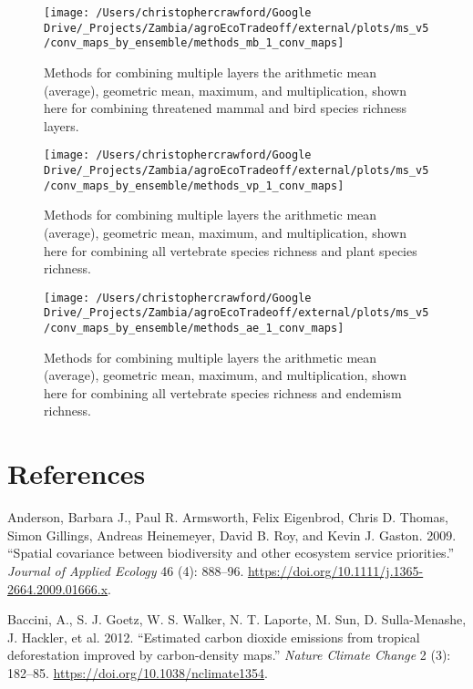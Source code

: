 \documentclass[
]{article}
\begin{document}
\begin{figure}
\texttt{[image: /Users/christophercrawford/Google Drive/\_Projects/Zambia/agroEcoTradeoff/external/plots/ms\_v5/conv\_maps\_by\_ensemble/methods\_mb\_1\_conv\_maps]} \caption{Methods for combining multiple layers the arithmetic mean (average), geometric mean, maximum, and multiplication, shown here for combining threatened mammal and bird species richness layers.}\label{fig:conv-maps-methods-mb-1}
\end{figure}

\begin{figure}
\texttt{[image: /Users/christophercrawford/Google Drive/\_Projects/Zambia/agroEcoTradeoff/external/plots/ms\_v5/conv\_maps\_by\_ensemble/methods\_vp\_1\_conv\_maps]} \caption{Methods for combining multiple layers the arithmetic mean (average), geometric mean, maximum, and multiplication, shown here for combining all vertebrate species richness and plant species richness.}\label{fig:conv-maps-methods-vp-1}
\end{figure}

\begin{figure}
\texttt{[image: /Users/christophercrawford/Google Drive/\_Projects/Zambia/agroEcoTradeoff/external/plots/ms\_v5/conv\_maps\_by\_ensemble/methods\_ae\_1\_conv\_maps]} \caption{Methods for combining multiple layers the arithmetic mean (average), geometric mean, maximum, and multiplication, shown here for combining all vertebrate species richness and endemism richness.}\label{fig:conv-maps-methods-ae-1}
\end{figure}

\newpage

\hypertarget{references}{%
\section*{References}\label{references}}

\hypertarget{refs}{}
\leavevmode\hypertarget{ref-Anderson2009}{}%
Anderson, Barbara J., Paul R. Armsworth, Felix Eigenbrod, Chris D. Thomas, Simon Gillings, Andreas Heinemeyer, David B. Roy, and Kevin J. Gaston. 2009. ``Spatial covariance between biodiversity and other ecosystem service priorities.'' \emph{Journal of Applied Ecology} 46 (4): 888--96. \url{https://doi.org/10.1111/j.1365-2664.2009.01666.x}.

\leavevmode\hypertarget{ref-Baccini2012}{}%
Baccini, A., S. J. Goetz, W. S. Walker, N. T. Laporte, M. Sun, D. Sulla-Menashe, J. Hackler, et al. 2012. ``Estimated carbon dioxide emissions from tropical deforestation improved by carbon-density maps.'' \emph{Nature Climate Change} 2 (3): 182--85. \url{https://doi.org/10.1038/nclimate1354}.
\end{document}

